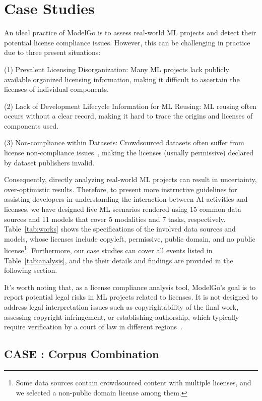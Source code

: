 \section{Case Studies}
\label{sec:case}
An ideal practice of ModelGo is to assess real-world ML projects and detect their potential license compliance issues. 
However, this can be challenging in practice due to three present situations:

(1) Prevalent Licensing Disorganization: Many ML projects lack publicly available organized licensing information, making it difficult to ascertain the licenses of individual components.

(2) Lack of Development Lifecycle Information for ML Reusing: ML reusing often occurs without a clear record, making it hard to trace the origins and licenses of components used.

(3) Non-compliance within Datasets: Crowdsourced datasets often suffer from license non-compliance issues~\cite{rajbahadur2021can}, making the licenses (usually permissive) declared by dataset publishers invalid.

Consequently, directly analyzing real-world ML projects can result in uncertainty, over-optimistic results.
Therefore, to present more instructive guidelines for assisting developers in understanding the interaction between AI activities and licenses, we have designed five ML scenarios rendered using 15 common data sources and 11 models that cover 5 modalities and 7 tasks, respectively.
Table~\ref{tab:works} shows the specifications of the involved data sources and models, whose licenses include copyleft, permissive, public domain, and no public license\footnote{Some data sources contain crowdsourced content with multiple licenses, and we selected a non-public domain license among them.}.
Furthermore, our case studies can cover all events listed in Table~\ref{tab:analysis}, and the their details and findings are provided in the following section.

It's worth noting that, as a license compliance analysis tool, ModelGo's goal is to report potential legal risks in ML projects related to licenses.
It is not designed to address legal interpretation issues such as copyrightability of the final work, assessing copyright infringement, or establishing authorship, which typically require verification by a court of law in different regions~\cite{national1979final, hedrick2019ithink, margoni2018artificial}.

\subsection{CASE  : Corpus Combination}


